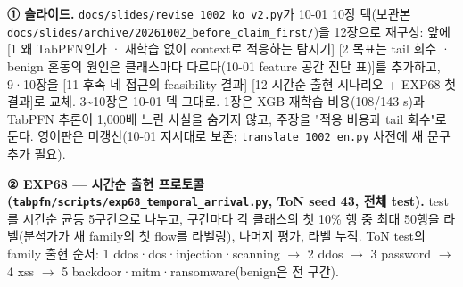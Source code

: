 \textbf{① 슬라이드.} \texttt{docs/\allowbreak{}\allowbreak{}sli\allowbreak{}des/\allowbreak{}\allowbreak{}revi\allowbreak{}se\_\allowbreak{}\allowbreak{}1002\_\allowbreak{}\allowbreak{}ko\_\allowbreak{}\allowbreak{}v2.\allowbreak{}py\allowbreak{}}가 10-01 10장 덱(보관본 \texttt{docs/\allowbreak{}\allowbreak{}sli\allowbreak{}des/\allowbreak{}\allowbreak{}arch\allowbreak{}ive/\allowbreak{}\allowbreak{}2026\allowbreak{}1002\_\allowbreak{}\allowbreak{}bef\allowbreak{}ore\_\allowbreak{}\allowbreak{}clai\allowbreak{}m\_\allowbreak{}\allowbreak{}first/\allowbreak{}\allowbreak{}})을 12장으로 재구성: 앞에 [1 왜 TabPFN인가 · 재학습 없이 context로 적응하는 탐지기] [2 목표는 tail 회수 · benign 혼동의 원인은 클래스마다 다르다(10-01 feature 공간 진단 표)]를 추가하고, 9·10장을 [11 후속 네 접근의 feasibility 결과] [12 시간순 출현 시나리오 +\allowbreak{} EXP68 첫 결과]로 교체. 3\textasciitilde{}10장은 10-01 덱 그대로. 1장은 XGB 재학습 비용(108/\allowbreak{}143 s)과 TabPFN 추론이 1,000배 느린 사실을 숨기지 않고, 주장을 "적응 비용과 tail 회수"로 둔다. 영어판은 미갱신(10-01 지시대로 보존; \texttt{translat\allowbreak{}e\_\allowbreak{}\allowbreak{}1002\_\allowbreak{}\allowbreak{}e\allowbreak{}n.\allowbreak{}py} 사전에 새 문구 추가 필요).

\textbf{② EXP68 — 시간순 출현 프로토콜(\texttt{tabpfn/\allowbreak{}\allowbreak{}s\allowbreak{}cripts/\allowbreak{}\allowbreak{}e\allowbreak{}xp68\_\allowbreak{}\allowbreak{}tem\allowbreak{}poral\_\allowbreak{}\allowbreak{}ar\allowbreak{}rival.\allowbreak{}py\allowbreak{}}, ToN seed 43, 전체 test).} test를 시간순 균등 5구간으로 나누고, 구간마다 각 클래스의 첫 10\% 행 중 최대 50행을 라벨(분석가가 새 family의 첫 flow를 라벨링), 나머지 평가, 라벨 누적. ToN test의 family 출현 순서: 1 ddos·dos·injection·scanning  \ensuremath{\rightarrow}  2 ddos  \ensuremath{\rightarrow}  3 password  \ensuremath{\rightarrow}  4 xss  \ensuremath{\rightarrow}  5 backdoor·mitm·ransomware(benign은 전 구간).


